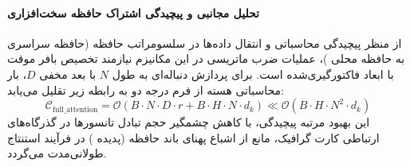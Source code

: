 \paragraph{تحلیل مجانبی و پیچیدگی اشتراک حافظه سخت‌افزاری}
از منظر پیچیدگی محاسباتی و انتقال داده‌ها در سلسومراتب حافظه (حافظه سراسری  به حافظه محلی )، عملیات ضرب ماتریسی در این مکانیزم نیازمند تخصیص بافر موقت با ابعاد فاکتورگیری‌شده است. برای پردازش دنباله‌ای به طول $N$ با بعد مخفی $D$، بار محاسباتی هسته از فرم درجه دو به رابطه زیر تقلیل می‌یابد:
\begin{equation}
\label{eq:complexity_full_attention}
\mathcal{C}_{\text{full\_attention}} = \mathcal{O}\left( B \cdot N \cdot D \cdot r + B \cdot H \cdot N \cdot d_k \right) \ll \mathcal{O}\left( B \cdot H \cdot N^2 \cdot d_k \right)
\end{equation}
این بهبود مرتبه پیچیدگی، با کاهش چشمگیر حجم تبادل تانسورها در گذرگاه‌های ارتباطی کارت گرافیک، مانع از اشباع پهنای باند حافظه (پدیده ) در فرآیند استنتاج طولانی‌مدت می‌گردد.
